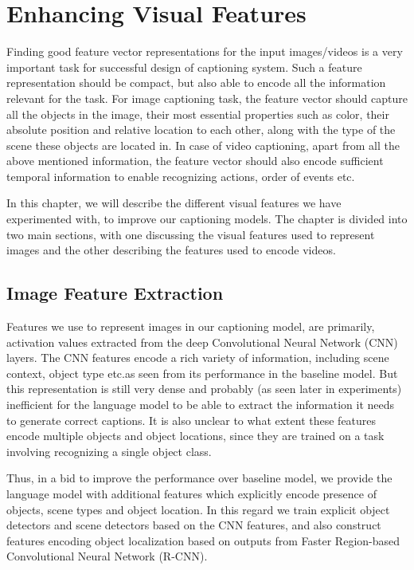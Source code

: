 \chapter{Enhancing Visual Features}
\label{chapter:VisFeatChapter}

Finding good feature vector representations for the input images/videos is a
very important task for successful design of captioning system.
Such a feature representation should be compact, but also able to encode all the
information relevant for the task. 
For image captioning task, the feature vector should capture all the objects in
the image, their most essential properties such as color, their absolute
position and relative location to each other, along with the type of the scene
these objects are located in.
In case of video captioning, apart from all the above mentioned information, the
feature vector should also encode sufficient temporal information to enable
recognizing actions, order of events etc.

In this chapter, we will describe the different visual features we have
experimented with, to improve our captioning models.
The chapter is divided into two main sections, with one discussing the visual
features used to represent images and the other describing the features used to
encode videos.

\section{Image Feature Extraction}
\label{sec:ImageFeat}

Features we use to represent images in our captioning model, are primarily,
activation values extracted from the deep Convolutional Neural Network (CNN)
layers.
The CNN features encode a rich variety of information, including scene context,
object type etc.\@ as seen from its performance in the baseline model.
But this representation is still very dense and probably (as seen later in
experiments) inefficient for the language model to be able to extract the
information it needs to generate correct captions.
It is also unclear to what extent these features encode multiple objects and
object locations, since they are trained on a task involving recognizing a
single object class.

Thus, in a bid to improve the performance over baseline model, we provide the
language model with additional features which explicitly encode presence of
objects, scene types and object location.
In this regard we train explicit object detectors and scene detectors based on
the CNN features, and also construct features encoding object localization based
on outputs from Faster Region-based Convolutional Neural Network (R-CNN).
